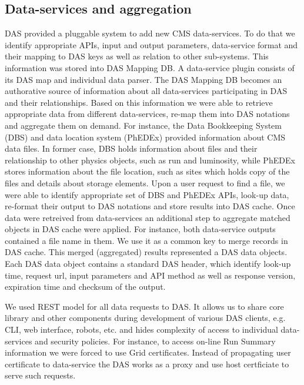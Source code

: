 \documentclass[a4paper]{jpconf}
\begin{document}
\subsection{Data-services and aggregation}
DAS provided a pluggable system to add new CMS data-services. To do that we
identify appropriate APIs, input and output parameters, data-service
format and their mapping to DAS keys as well as relation to other sub-systems. 
This information was stored into DAS Mapping DB. A data-service plugin consists
of its DAS map and individual data parser. The DAS Mapping DB becomes an authorative
source of information about all data-services participating in DAS and their
relationships. Based on this information we were able to retrieve appropriate data
from different data-services, re-map them into DAS notations and
aggregate them on demand.
For instance, the Data Bookkeeping System (DBS) and data location system (PhEDEx)
provided information about CMS data files. In former case, DBS holds information about
files and their relationship to other physics objects, such as run and luminosity, 
while PhEDEx stores information about the file location, such as sites which
holds copy of the files and details about storage elements.
Upon a user request to find a file, we were able to identify appropriate set of
DBS and PhEDEx APIs, look-up data, re-format their output to DAS notations and
store results into DAS cache.
Once data were retreived from data-services an additional step to aggregate
matched objects in DAS cache were applied. For instance, both data-service outputs 
contained a file name in them. We use it as a common key to merge records in DAS cache.
This merged (aggregated) results represented a DAS data objects. Each DAS data
object contains a standard DAS header, which identify look-up time,
request url, input parameters and API method as well as response version, expiration
time and checksum of the output. 

We used REST model \cite{REST} for all data requests to DAS.
It allows us to share core library and other components during development of 
various DAS clients, e.g. CLI, web interface, robots, etc. and hides
complexity of access to individual data-services and security policies.
For instance, to access on-line Run Summary information we were forced to use
Grid certificates. Instead of propagating user certificate to data-service
the DAS works as a proxy and use host certficiate to serve such requests.
\end{document}
